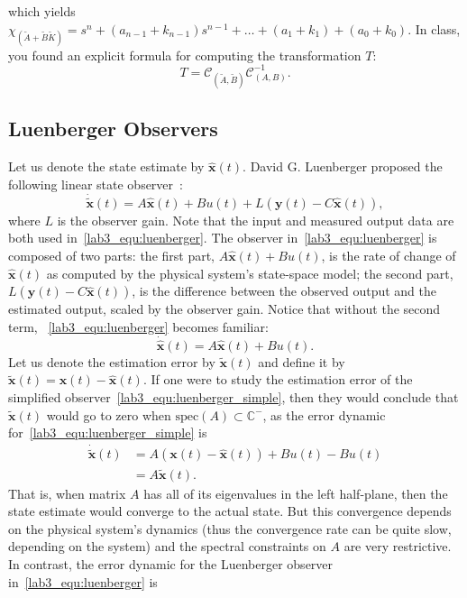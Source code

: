 which yields $\chi_{(\tilde{A}+\tilde{B}\tilde{K})} = s^n + (a_{n-1}+k_{n-1})s^{n-1} + \dots + (a_1 + k_1) + (a_0 + k_0)$. In class, you found an explicit formula for computing the transformation $T$:
\[
    T=\mathcal{C}_{(\tilde{A},\tilde{B})} \mathcal{C}_{(A,B)}^{-1}.
\]

\subsection{Luenberger Observers}
Let us denote the state estimate by $\hat{\mathbf{x}}(t)$. David G. Luenberger proposed the following linear state observer~\cite{david1971introduction}:
\begin{equation}\label{lab3_equ:luenberger}
    \mathbf{\dot{\tilde{x}}}(t)=A\hat{\mathbf{x}}(t)+Bu(t)+L(\mathbf{y}(t)-C\hat{\mathbf{x}}(t)),
\end{equation}
where $L$ is the observer gain. Note that the input and measured output data are both used in~\eqref{lab3_equ:luenberger}. The observer in~\eqref{lab3_equ:luenberger} is composed of two parts: the first part, $A\hat{\mathbf{x}}(t)+Bu(t)$, is the rate of change of $\hat{\mathbf{x}}(t)$ as computed by the physical system's state-space model; the second part, $L(\mathbf{y}(t)-C\hat{\mathbf{x}}(t))$, is the difference between the observed output and the estimated output, scaled by the observer gain. Notice that without the second term, ~\eqref{lab3_equ:luenberger} becomes familiar:
\begin{equation}\label{lab3_equ:luenberger_simple}
    \mathbf{\dot{\hat{x}}}(t)=A\hat{\mathbf{x}}(t)+Bu(t).
\end{equation}
Let us denote the estimation error by $\tilde{\mathbf{x}}(t)$ and define it by $\tilde{\mathbf{x}}(t) = \mathbf{x}(t)-\hat{\mathbf{x}}(t)$. If one were to study the estimation error of the simplified observer~\eqref{lab3_equ:luenberger_simple}, then they would conclude that $\tilde{\mathbf{x}}(t)$ would go to zero when $\text{spec}(A) \subset \mathbb{C}^-$, as the error dynamic for~\eqref{lab3_equ:luenberger_simple} is
\begin{align*}
    \mathbf{\dot{\tilde{x}}}(t) & = A \left(\mathbf{x}(t)-\hat{\mathbf{x}}(t)\right)+Bu(t) - Bu(t) \\
                                & = A\tilde{\mathbf{x}}(t).
\end{align*}
That is, when matrix $A$ has all of its eigenvalues in the left half-plane, then the state estimate would converge to the actual state. But this convergence depends on the physical system's dynamics (thus the convergence rate can be quite slow, depending on the system) and the spectral constraints on $A$ are very restrictive. In contrast, the error dynamic for the Luenberger observer in~\eqref{lab3_equ:luenberger} is
